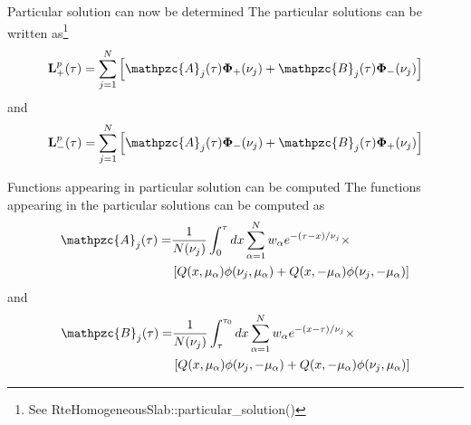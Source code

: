 \documentclass[14]{beamer}
\newcommand{\mvec}[1]{\mathbf{#1}}
\newcommand{\gvec}[1]{\boldsymbol{#1}}
\newcommand{\script}[1]{\mathpzc{#1}}
\begin{document}
\begin{frame}{Particular solution can now be determined}
  The particular solutions can be written as\footnote{See
    RteHomogeneousSlab::particular\_solution()}
  \begin{align}
    \mvec{L}^p_+(\tau) = \sum_{j=1}^N
    \left[
      \script{A}_j(\tau) \gvec{\Phi}_+(\nu_j) +
      \script{B}_j(\tau) \gvec{\Phi}_-(\nu_j)
    \right]
  \end{align}
  and
  \begin{align}
    \mvec{L}^p_-(\tau) = \sum_{j=1}^N
    \left[
      \script{A}_j(\tau) \gvec{\Phi}_-(\nu_j) +
      \script{B}_j(\tau) \gvec{\Phi}_+(\nu_j)
    \right]
  \end{align}
\end{frame}

\begin{frame}{Functions appearing in particular solution can be
    computed}
  The functions appearing in the particular solutions can be computed
  as
  \begin{align}
    \script{A}_j(\tau) = &\frac{1}{N(\nu_j)}
    \int_0^\tau dx
    \sum_{\alpha=1}^N w_\alpha e^{-(\tau-x)/\nu_j} \times \notag \\
    & \left[
      Q(x,\mu_\alpha)\phi(\nu_j,\mu_\alpha) +
      Q(x,-\mu_\alpha)\phi(\nu_j,-\mu_\alpha)
      \right]
  \end{align}
  and
  \begin{align}
    \script{B}_j(\tau) = &\frac{1}{N(\nu_j)}
    \int_\tau^{\tau_0} dx
    \sum_{\alpha=1}^N w_\alpha e^{-(x-\tau)/\nu_j} \times \notag \\
    &\left[
      Q(x,\mu_\alpha)\phi(\nu_j,-\mu_\alpha) +
      Q(x,-\mu_\alpha)\phi(\nu_j,\mu_\alpha)
      \right]
  \end{align}
\end{frame}
\end{document}
